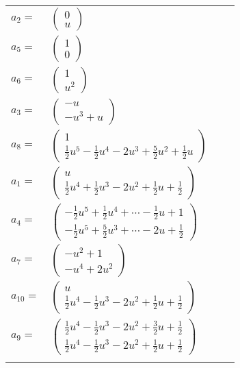 \documentclass[1p]{elsarticle_modified}
\theoremstyle{definition}
\begin{document}
\begin{tabular}{m{7pt} m{180pt} m{7pt} m{180pt} }
\flushright $a_{2}=$&$\begin{pmatrix}0\\u\end{pmatrix}$ \\
\flushright $a_{5}=$&$\begin{pmatrix}1\\0\end{pmatrix}$ \\
\flushright $a_{6}=$&$\begin{pmatrix}1\\u^2\end{pmatrix}$ \\
\flushright $a_{3}=$&$\begin{pmatrix}- u\\- u^3+u\end{pmatrix}$ \\
\flushright $a_{8}=$&$\begin{pmatrix}1\\\frac{1}{2} u^5-\frac{1}{2} u^4-2 u^3+\frac{5}{2} u^2+\frac{1}{2} u\end{pmatrix}$ \\
\flushright $a_{1}=$&$\begin{pmatrix}u\\\frac{1}{2} u^4+\frac{1}{2} u^3-2 u^2+\frac{1}{2} u+\frac{1}{2}\end{pmatrix}$ \\
\flushright $a_{4}=$&$\begin{pmatrix}-\frac{1}{2} u^5+\frac{1}{2} u^4+\cdots-\frac{1}{2} u+1\\-\frac{1}{2} u^5+\frac{5}{2} u^3+\cdots-2 u+\frac{1}{2}\end{pmatrix}$ \\
\flushright $a_{7}=$&$\begin{pmatrix}- u^2+1\\- u^4+2 u^2\end{pmatrix}$ \\
\flushright $a_{10}=$&$\begin{pmatrix}u\\\frac{1}{2} u^4-\frac{1}{2} u^3-2 u^2+\frac{1}{2} u+\frac{1}{2}\end{pmatrix}$ \\
\flushright $a_{9}=$&$\begin{pmatrix}\frac{1}{2} u^4-\frac{1}{2} u^3-2 u^2+\frac{3}{2} u+\frac{1}{2}\\\frac{1}{2} u^4-\frac{1}{2} u^3-2 u^2+\frac{1}{2} u+\frac{1}{2}\end{pmatrix}$\\&\end{tabular}
\end{document}
